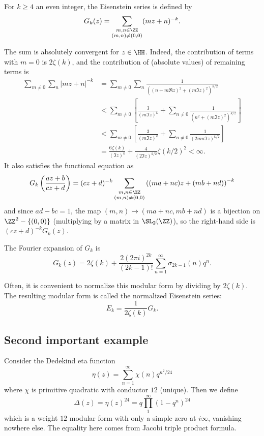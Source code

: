 \begin{definition}
  For $k \ge 4$ an even integer,
  the \alert{Eisenstein series} is defined by
  \[ G_k(z) =
    \sum_{\substack{m,n \in \ZZ \\ (m,n) \ne (0,0)}} (mz+n)^{-k}. \]
\end{definition}
The sum is absolutely convergent for $z \in \HH$.
Indeed, the contribution of terms with $m=0$ is $2\zeta(k)$, and
the contribution of (absolute values) of remaining terms is
\begin{align*} \sum_{m \ne 0} \sum_{n}
  \left\lvert mz+n \right\rvert^{-k}
  &= \sum_{m \ne 0} \sum_{n}
  \frac{1}{\left( (n + m \Re z)^2 + (m \Im z)^2 \right)^{k/2}} \\
  &< \sum_{m \ne 0} \left[
    \frac{3}{(m \Im z)^k}
    + \sum_{n \ne 0} \frac{1}{\left( n^2 + (m \Im z)^2 \right)^{k/2}} \right] \\
  &< \sum_{m \ne 0} \left[
    \frac{3}{(m \Im z)^k}
    + \sum_{n \ne 0} \frac{1}{(2mn \Im z)^{k/2}} \right] \\
  &= \frac{6\zeta(k)}{(\Im z)^k}
  + \frac{4}{(2\Im z)^{k/2}} \zeta(k/2)^2 < \infty.
\end{align*}
It also satisfies the functional equation as
\[ G_k\left( \frac{az+b}{cz+d} \right)
  = (cz+d)^{-k}
  \sum_{\substack{m,n \in \ZZ \\ (m,n) \ne (0,0)}}
  \left( (ma+nc)z + (mb+nd)  \right)^{-k}
\]
and since $ad-bc=1$,
the map $(m,n) \mapsto (ma+nc,mb+nd)$ is a bijection on $\ZZ^2 - \{(0,0)\}$
(multiplying by a matrix in $\SL_2(\ZZ)$),
so the right-hand side is $(cz+d)^{-k} G_k(z)$.

The Fourier expansion of $G_k$ is
\[ G_k(z) =
  2\zeta(k) + \frac{2(2\pi i)^{2k}}{(2k-1)!}
  \sum_{n=1}^\infty \sigma_{2k-1}(n) q^n. \]

Often, it is convenient to normalize this modular form by
dividing by $2\zeta(k)$. The resulting modular form is called
the \alert{normalized Eisenstein series}:
\[ E_k = \frac{1}{2\zeta(k)} G_k. \]




\subsection{Second important example}
Consider the Dedekind eta function
\[ \eta(z) = \sum_{n=1}^\infty \chi(n) q^{n^2/24} \]
where $\chi$ is primitive quadratic with conductor $12$ (unique).
Then we define
\[ \Delta(z) = \eta(z)^{24} = q \prod_1^\infty (1-q^n)^{24} \]
which is a weight $12$ modular form with only a simple zero at $i\infty$,
vanishing nowhere else.
The equality here comes from Jacobi triple product formula.

